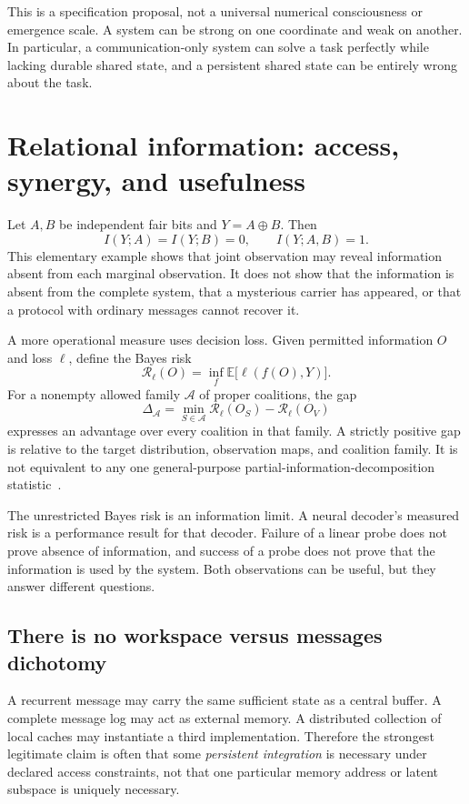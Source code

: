 \documentclass[11pt,letterpaper]{article}
\theoremstyle{plain}
\theoremstyle{definition}
\theoremstyle{remark}
\newcommand{\E}{\mathbb E}
\begin{document}
This is a specification proposal, not a universal numerical consciousness or emergence scale. A system can be strong on one coordinate and weak on another. In particular, a communication-only system can solve a task perfectly while lacking durable shared state, and a persistent shared state can be entirely wrong about the task.

\section{Relational information: access, synergy, and usefulness}\label{sec:information}
Let $A,B$ be independent fair bits and $Y=A\oplus B$. Then
\[
I(Y;A)=I(Y;B)=0,\qquad I(Y;A,B)=1.
\]
This elementary example shows that joint observation may reveal information absent from each marginal observation. It does not show that the information is absent from the complete system, that a mysterious carrier has appeared, or that a protocol with ordinary messages cannot recover it.

A more operational measure uses decision loss. Given permitted information $O$ and loss $\ell$, define the Bayes risk
\[
\mathcal R_\ell(O)=\inf_f\E\bigl[\ell(f(O),Y)\bigr].
\]
For a nonempty allowed family $\mathcal A$ of proper coalitions, the gap
\begin{equation}\label{eq:coalition}
\Delta_{\mathcal A}=\min_{S\in\mathcal A}\mathcal R_\ell(O_S)
-\mathcal R_\ell(O_V)
\end{equation}
expresses an advantage over every coalition in that family. A strictly positive gap is relative to the target distribution, observation maps, and coalition family. It is not equivalent to any one general-purpose partial-information-decomposition statistic~\cite{williams}.

The unrestricted Bayes risk is an information limit. A neural decoder's measured risk is a performance result for that decoder. Failure of a linear probe does not prove absence of information, and success of a probe does not prove that the information is used by the system. Both observations can be useful, but they answer different questions.

\subsection{There is no workspace versus messages dichotomy}
A recurrent message may carry the same sufficient state as a central buffer. A complete message log may act as external memory. A distributed collection of local caches may instantiate a third implementation. Therefore the strongest legitimate claim is often that some \emph{persistent integration} is necessary under declared access constraints, not that one particular memory address or latent subspace is uniquely necessary.
\end{document}
